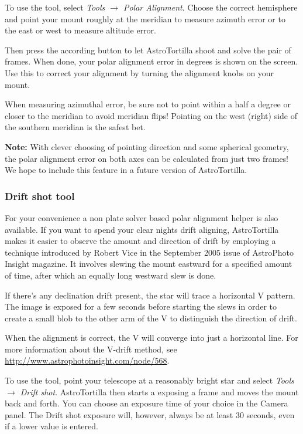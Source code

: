 \documentclass[english]{article}
\newcommand{\surl}[1]{{\small \url{#1}}}
\begin{document}
To use the tool, select \emph{Tools $\rightarrow$ Polar Alignment}. Choose the
correct hemisphere and point your mount roughly at the meridian to measure
azimuth error or to the east or west to measure altitude error.

Then press the according button to let AstroTortilla shoot and solve the pair
of frames. When done, your polar alignment error in degrees is shown on the
screen. Use this to correct your alignment by turning the alignment knobs on
your mount.

When measuring azimuthal error, be sure not to point within a half a degree or
closer to the meridian to avoid meridian flips! Pointing on the west (right)
side of the southern meridian is the safest bet.

{\footnotesize \textbf{Note:} With clever choosing of pointing direction and some
spherical geometry, the polar alignment error on both axes can be calculated from 
just two frames! We hope to include this feature in a future version of AstroTortilla.}

\subsubsection{Drift shot tool}

For your convenience a non plate solver based polar alignment helper is also available.
If you want to spend your clear nights drift aligning, AstroTortilla makes it 
easier to observe the amount and direction of drift by
employing a technique introduced by Robert Vice in the September 2005 issue of
AstroPhoto Insight magazine. It involves slewing the mount eastward for a
specified amount of time, after which an equally long westward slew is done.

If there's any declination drift present, the star will trace a horizontal V
pattern. The image is exposed for a few seconds before starting the slews in
order to create a small blob to the other arm of the V to distinguish the
direction of drift.

When the alignment is correct, the V will converge into just a horizontal line.
For more information about the V-drift method, see
\surl{http://www.astrophotoinsight.com/node/568}.

To use the tool, point your telescope at a reasonably bright star and select
\emph{Tools $\rightarrow$ Drift shot}.  AstroTortilla then starts a exposing 
a frame and moves the mount back and forth. You can choose an exposure time of 
your choice in the Camera panel. The Drift shot exposure will, however, always 
be at least 30 seconds, even if a lower value is entered.
\end{document}
